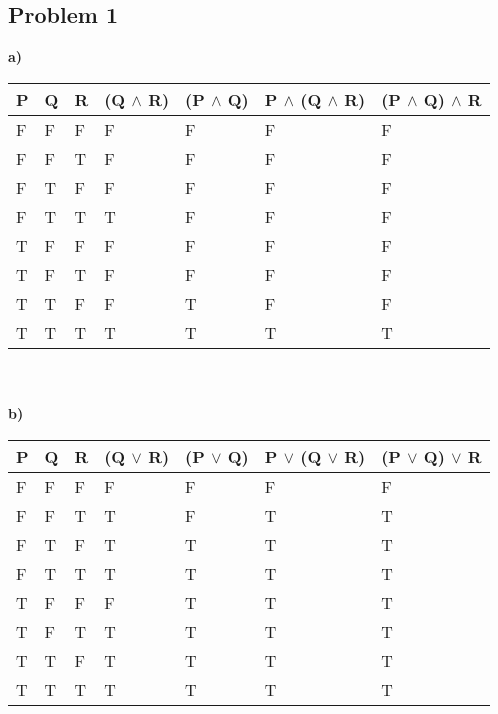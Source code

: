 \documentclass[12pt]{article}
\begin{document}
\subsection*{Problem 1}
\textbf{a) }
\begin{table}[!h]
\begin{tabular}{|l|l|l|l|l|l|l|}
\hline
P & Q & R & (Q $\land$ R) & (P $\land$ Q) & P $\land$ (Q $\land$ R) & (P $\land$ Q) $\land$ R \\ \hline
F & F & F & F         & F         & F               & F               \\ \hline
F & F & T & F         & F         & F               & F               \\ \hline
F & T & F & F         & F         & F               & F               \\ \hline
F & T & T & T         & F         & F               & F               \\ \hline
T & F & F & F         & F         & F               & F               \\ \hline
T & F & T & F         & F         & F               & F               \\ \hline
T & T & F & F         & T         & F               & F               \\ \hline
T & T & T & T         & T         & T               & T               \\ \hline
\end{tabular}
\end{table} \\
\\
\textbf{b) }
\begin{table}[!h]
\begin{tabular}{|l|l|l|l|l|l|l|}
\hline
P & Q & R & (Q $\lor$ R) & (P $\lor$ Q) & P $\lor$ (Q $\lor$ R) & (P $\lor$ Q) $\lor$ R \\ \hline
F & F & F & F         & F         & F               & F               \\ \hline
F & F & T & T         & F         & T               & T               \\ \hline
F & T & F & T         & T         & T               & T               \\ \hline
F & T & T & T         & T         & T               & T               \\ \hline
T & F & F & F         & T         & T               & T               \\ \hline
T & F & T & T         & T         & T               & T               \\ \hline
T & T & F & T         & T         & T               & T               \\ \hline
T & T & T & T         & T         & T               & T               \\ \hline
\end{tabular}
\end{table} \\
\end{document}
